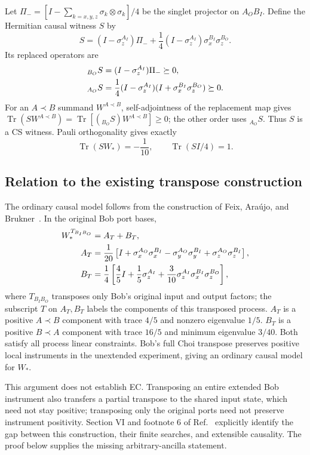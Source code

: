 \documentclass[11pt]{article}
\newcommand{\Tr}{\operatorname{Tr}}
\begin{document}
Let $\Pi_-=[I-\sum_{k=x,y,z}\sigma_k\otimes\sigma_k]/4$ be the singlet projector on $A_OB_I$. Define the Hermitian causal witness $S$ by
\begin{equation}
 S=(I-\sigma_z^{A_I})\Pi_-
   +\frac14(I-\sigma_z^{A_I})\sigma_x^{B_I}\sigma_z^{B_O}.
 \label{eq:witness}
\end{equation}
Its replaced operators are
\begin{align}
 {}_{B_O}S&=(I-\sigma_z^{A_I})\Pi_-\succeq0,\notag\\
 {}_{A_O}S&=\frac14(I-\sigma_z^{A_I})
        (I+\sigma_x^{B_I}\sigma_z^{B_O})\succeq0.
 \label{eq:witness-replacements}
\end{align}
For an $A\prec B$ summand $W^{A\prec B}$, self-adjointness of the replacement map gives
$\Tr(SW^{A\prec B})=\Tr[({}_{B_O}S)W^{A\prec B}]\ge0$; the other order uses \({}_{A_O}S\). Thus $S$ is a CS witness. Pauli orthogonality gives exactly
\begin{equation}
 \Tr(SW_*)=-\frac1{10},\qquad \Tr(SI/4)=1.
 \label{eq:witness-exact-values}
\end{equation}

\subsection{Relation to the existing transpose construction}
The ordinary causal model follows from the construction of Feix, Ara\'{u}jo, and Brukner~\cite{Feix}. In the original Bob port bases,
\begin{align}
 W_*^{T_{B_IB_O}}&=A_T+B_T,\notag\\
 A_T&=\frac1{20}\left[I+\sigma_x^{A_O}\sigma_x^{B_I}
 -\sigma_y^{A_O}\sigma_y^{B_I}+\sigma_z^{A_O}\sigma_z^{B_I}\right],\notag\\
 B_T&=\frac14\left[\frac45I+\frac15\sigma_z^{A_I}
 +\frac3{10}\sigma_z^{A_I}\sigma_x^{B_I}\sigma_z^{B_O}\right],
 \label{eq:FAB-relation}
\end{align}
where $T_{B_IB_O}$ transposes only Bob's original input and output factors; the subscript $T$ on $A_T,B_T$ labels the components of this transposed process. $A_T$ is a positive $A\prec B$ component with trace $4/5$ and nonzero eigenvalue $1/5$. $B_T$ is a positive $B\prec A$ component with trace $16/5$ and minimum eigenvalue $3/40$. Both satisfy all process linear constraints. Bob's full Choi transpose preserves positive local instruments in the unextended experiment, giving an ordinary causal model for $W_*$.

This argument does not establish EC. Transposing an entire extended Bob instrument also transfers a partial transpose to the shared input state, which need not stay positive; transposing only the original ports need not preserve instrument positivity. Section VI and footnote 6 of Ref.~\cite{Feix} explicitly identify the gap between this construction, their finite searches, and extensible causality. The proof below supplies the missing arbitrary-ancilla statement.
\end{document}
